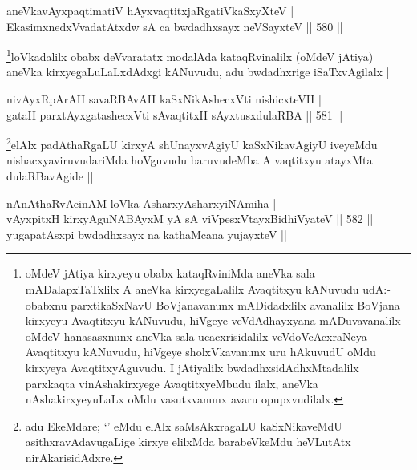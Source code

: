 
\begin{shl}
aneVkavAyxpaqtimatiV hAyxvaqtitxjaRgatiVkaSxyXteV | \\
EkasimxnedxVvadatAtxdw sA ca bwdadhxsayx neVSayxteV \hfill||  580 ||  
\end{shl}

\begin{artha}
\footnote{oMdeV jAtiya kirxyeyu obabx kataqRviniMda aneVka sala mADalapxTaTxlilx A aneVka kirxyegaLalilx Avaqtitxyu kANuvudu udA:- obabxnu parxtikaSxNavU BoVjanavanunx mADidadxlilx avanalilx BoVjana kirxyeyu Avaqtitxyu kANuvudu, hiVgeye veVdAdhayxyana mADuvavanalilx oMdeV hanasasxnunx aneVka sala ucacxrisidalilx veVdoVcAcxraNeya Avaqtitxyu kANuvudu, hiVgeye sholxVkavanunx uru hAkuvudU oMdu kirxyeya AvaqtitxyAguvudu. I jAtiyalilx bwdadhxsidAdhxMtadalilx parxkaqta vinAshakirxyege AvaqtitxyeMbudu ilalx, aneVka nAshakirxyeyuLaLx oMdu vasutxvanunx avaru opupxvudilalx.}loVkadalilx obabx deVvaratatx modalAda kataqRvinalilx (oMdeV jAtiya) aneVka kirxyegaLuLaLxdAdxgi kANuvudu, adu bwdadhxrige iSaTxvAgilalx ||
\end{artha}

\begin{shl}
nivAyxRpArAH savaRBAvAH kaSxNikAshecxVti nishicxteVH | \\
gataH parxtAyxgatashecxVti sA\s \s vaqtitxH sAyxtusxdulaRBA \hfill||  581 ||  
\end{shl}

\begin{artha}
\footnote{adu EkeMdare; `\stext' eMdu elAlx saMsAkxragaLU kaSxNikaveMdU asithxravAdavugaLige kirxye elilxMda barabeVkeMdu heVLutAtx nirAkarisidAdxre.}elAlx padAthaRgaLU kirxyA shUnayxvAgiyU kaSxNikavAgiyU iveyeMdu nishacxyaviruvudariMda hoVguvudu baruvudeMba A vaqtitxyu atayxMta dulaRBavAgide ||
\end{artha}


\begin{shl}
nAnAthaRvAcinAM loVka AsharxyAsharxyiNAmiha | \\
vAyxpitxH kirxyAguNABAyxM yA sA viVpesxVtayxBidhiVyateV \hfill||  582 ||  
yugapatAsx\s pi bwdadhxsayx na kathaMcana yujayxteV ||  \\
\end{shl}

